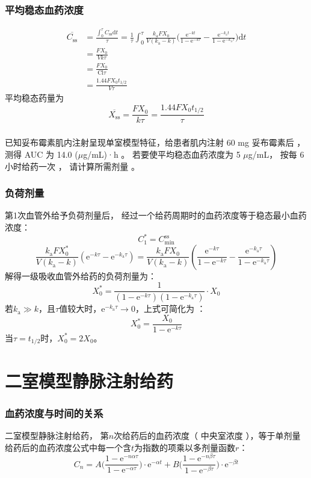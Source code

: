 \documentclass[dvipsnames, svgnames, x11names]{beamer}
\begin{document}
\begin{frame}
	\frametitle{平均稳态血药浓度}
	\[
		\begin{aligned}
				\overline{C_\mathrm{ss}}& =\frac{\int_{0}^{\tau}C_{\mathrm{ss}}\mathrm{d}t}{\tau}=\frac{1}{\tau}\int_{0}^{\tau}\frac{k_\mathrm{a}FX_{0}}{V(k_{\mathrm{a}}-k)}\Big(\frac{\mathrm{e}^{-kt}}{1-\mathrm{e}^{-k\tau}}-\frac{\mathrm{e}^{-k_\mathrm{a}t}}{1-\mathrm{e}^{-k_\mathrm{a}\tau}}\Big)\mathrm{d}t  \\
				& =\frac{FX_{0}}{Vk\tau} \\
				& = \frac{FX_{0}}{\mathrm{Cl} \tau} \\
				& = \frac{1.44FX_{0}t_{1/2}}{V\tau}
		\end{aligned}
	\]
	平均稳态药量为
	\[
		\overline{X_\mathrm{ss}} = \frac{FX_{0}}{k\tau} = \frac{1.44FX_{0}t_{1/2}}{\tau}
	\]
\end{frame}


\begin{frame}[t]
	\frametitle{}
	\begin{example}
		已知妥布霉素肌内注射呈现单室模型特征，给患者肌内注射 60 mg 妥布霉素后 ， 测得 AUC 为 14.0 ($\mu$g/mL)·h 。 若要使平均稳态血药浓度为 5 $\mu$g/mL， 按每 6 小时给药一次 ， 请计算所需剂量 。
	\end{example}
\end{frame}


\begin{frame}
	\frametitle{负荷剂量}
	第1次血管外给予负荷剂量后， 经过一个给药周期时的血药浓度等于稳态最小血药浓度：
	\[
		C_1^* = C_\mathrm{min}^\mathrm{ss}
	\]
	\[
		\frac{k_\mathrm{a}FX_0^*}{V(k_\mathrm{a}-k)}(\mathrm{e}^{-k\tau}-\mathrm{e}^{-k_\mathrm{a}\tau}) = \frac{k_\mathrm{a}FX_0}{V(k_\mathrm{a}-k)}\left(\frac{\mathrm{e}^{-k\tau}}{1-\mathrm{e}^{-k\tau}}-\frac{\mathrm{e}^{-k_\mathrm{a}\tau}}{1-\mathrm{e}^{-k_\mathrm{a}\tau}}\right)
	\]
	解得一级吸收血管外给药的负荷剂量为：
	\[
		X_0^*=\dfrac{1}{(1-\mathrm{e}^{-k\tau})(1-\mathrm{e}^{-k_\mathrm{a}\tau})}\cdot X_0
	\]
	若$k_{\mathrm{a}}\gg k$，且$\tau$值较大时，$\mathrm{e}^{-k_{\mathrm{a}}\tau} \to 0$，上式可简化为 ：
	\[
		X_0^*=\dfrac{X_0}{1-\mathrm{e}^{-k\tau}}
	\]
	当$\tau = t_{1/2}$时，$X_0^* = 2X_0$。
\end{frame}


\section{二室模型静脉注射给药}


\begin{frame}
	\frametitle{血药浓度与时间的关系}
	二室模型静脉注射给药， 第$n$次给药后的血药浓度（ 中央室浓度 ），等于单剂量给药后的血药浓度公式中每一个含$t$为指数的项乘以多剂量函数$r$：
	\[
		C_n=A\Big(\frac{1-\mathrm{e}^{-n\alpha\tau}}{1-\mathrm{e}^{-\alpha\tau}}\Big)\cdot\mathrm{e}^{-\alpha t}+B\Big(\frac{1-\mathrm{e}^{-n\beta\tau}}{1-\mathrm{e}^{-\beta\tau}}\Big)\cdot\mathrm{e}^{-\beta t}
	\]
\end{frame}
\end{document}
